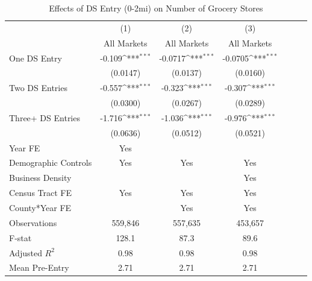 \def\sym#1{\ifmmode^{#1}\else\(^{#1}\)\fi}
\begin{table}[ht]
\caption{Effects of DS Entry (0-2mi) on Number of Grocery Stores}
\label{RF_exit_table_main}
\centering

\begin{threeparttable}

\begin{tabular}{l*{6}{c}}
\hline\hline
                &\multicolumn{1}{c}{(1)}         &\multicolumn{1}{c}{(2)}         &\multicolumn{1}{c}{(3)} \\
                &All Markets         &All Markets         &All Markets             \\
\hline
One DS Entry &   -0.109\sym{***}&  -0.0717\sym{***}&  -0.0705\sym{***}\\
             &  (0.0147)         & (0.0137)         & (0.0160)         \\

Two DS Entries  &  -0.557\sym{***}&   -0.323\sym{***}&   -0.307\sym{***}\\
              & (0.0300)         & (0.0267)         & (0.0289)         \\

Three+ DS Entries &   -1.716\sym{***}&   -1.036\sym{***}&   -0.976\sym{***}\\
                      & (0.0636)         & (0.0512)         & (0.0521)    \\

\addlinespace
Year FE                   &  Yes      &        &        \\
Demographic Controls                   &    Yes      &   Yes    & Yes     \\
Business Density                      &          &        & Yes       \\

Census Tract FE                       &    Yes      &   Yes    & Yes      \\
County*Year FE                     &          &  Yes      & Yes       \\



\hline
Observations           &  559,846         &  557,635         &  453,657         \\

F-stat                &    128.1         &     87.3         &     89.6         \\
Adjusted \(R^{2}\)        &     0.98         &     0.98         &     0.98         \\
Mean Pre-Entry          &     2.71         &     2.71         &     2.71         \\


\end{tabular}
\end{threeparttable}
\end{table}
